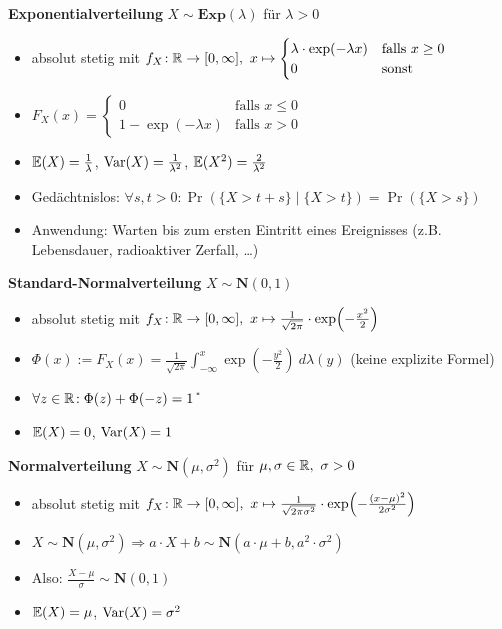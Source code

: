 \textbf{Exponentialverteilung} $X\sim\mathbf{Exp}(\lambda)$ für $\lambda > 0$
\begin{itemize}
\item absolut stetig mit
  $f_X\!: \mathbb{R} \to [0,\infty],\ x \mapsto \begin{cases}
  \lambda \cdot \exp(-\lambda x) & \text{falls } x \geq 0	\\
  0                              & \text{sonst }
  \end{cases}$

\item
  $F_X(x) = \begin{cases}
  0                    & \text{falls } x \leq 0  \\
  1 - \exp(-\lambda x) & \text{falls } x > 0
  \end{cases}$

\item $\mathbb{E}(X) = \frac{1}{\lambda}$, $\operatorname{Var}(X) = \frac{1}{\lambda^2}$,
  $\mathbb{E}(X^2) = \frac{2}{\lambda^2}$

\item Gedächtnislos: $\forall s,t>0\!: \Pr(\{X>t+s\} \mid \{X>t\}) = \Pr(\{X>s\})$

\item Anwendung: Warten bis zum ersten Eintritt eines Ereignisses
  (z.B. Lebensdauer, radioaktiver Zerfall, \ldots)
\end{itemize}

\clearpage
\textbf{Standard-Normalverteilung} $X\sim\mathbf{N}(0,1)$
\begin{itemize}
\item absolut stetig mit $f_X\!: \R \to [0,\infty],\
  x \mapsto \frac{1}{\sqrt{2\pi}} \cdot \exp\left(-\frac{x^2}{2}\right)$

\item $\Phi(x) := F_X(x)=
  \frac{1}{\sqrt{2\pi}} \int_{-\infty}^{x} \exp\left(-\frac{y^2}{2}\right)~d\lambda(y)$
  (keine explizite Formel)

\item $\forall z\in\mathbb{R}\!: \Phi(z) + \Phi(-z) = 1$ \U

\item $\mathbb{E}(X) = 0$, $\operatorname{Var}(X) = 1$

\end{itemize}

\textbf{Normalverteilung} $X\sim\mathbf{N}(\mu,\sigma^2)$ für
  $\mu,\sigma\in\mathbb{R},\ \sigma > 0$
\begin{itemize}
\item absolut stetig mit $f_X\!: \R \to [0,\infty],\
  x \mapsto \frac{1}{\sqrt{2\pi\sigma^2}} \cdot \exp\left(-\frac{(x-\mu)^2}{2\sigma^2}\right)$

\item $X\sim\mathbf{N}(\mu,\sigma^2)
  \Rightarrow a \cdot X + b \sim\mathbf{N}(a\cdot\mu+b,a^2\cdot\sigma^2)$

\item Also: $\frac{X-\mu}{\sigma} \sim \mathbf{N}(0,1)$

\item $\mathbb{E}(X) = \mu$, $\operatorname{Var}(X) = \sigma^2$
\end{itemize}

